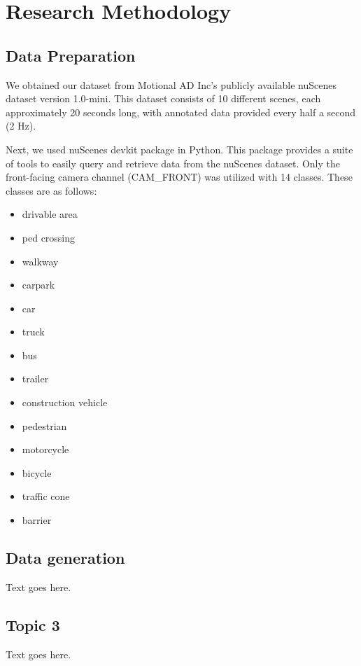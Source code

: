 \chapter{Research Methodology}


\section{Data Preparation}

We obtained our dataset from Motional AD Inc's publicly available nuScenes dataset version 1.0-mini. This dataset consists of 10 different scenes,
each approximately 20 seconds long, with annotated data provided every half a second (2 Hz).

Next, we used nuScenes devkit package in Python. This package provides a suite of tools to 
easily query and retrieve data from the nuScenes dataset. Only the front-facing camera channel (CAM\_FRONT) was utilized
with 14 classes. These classes are as follows:
\begin{itemize}
    \item drivable area
    \item ped crossing
    \item walkway
    \item carpark
    \item car
    \item truck
    \item bus
    \item trailer
    \item construction vehicle
    \item pedestrian
    \item motorcycle
    \item bicycle
    \item traffic cone
    \item barrier
\end{itemize}


\section{Data generation}

Text goes here.

\section{Topic 3}

Text goes here.

